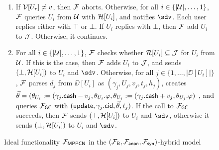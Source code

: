 \begin{figure*}[!t]
{{\begin{enumerate}
	
	
	\item If $\mathcal{V}[U_r] \neq v$, then $\mathcal{F}$ aborts. Otherwise, for all $i \in \{|\mathcal{U}|,\ldots,1\}$, 
	$\mathcal{F}$ queries $U_i$ from $\mathcal{U}$ with $\mathcal{H}[U_i]$, and notifies $\sdv$. Each user replies either 
	with $\top$ or $\bot$. If $U_i$ replies with $\bot$, then $\mathcal{F}$ add $U_i$ to $\mathcal{J}$. 
	Otherwise, it continues.
	
	
	\item For all $i \in \{|\mathcal{U}|,\ldots,1\}$, $\mathcal{F}$ checks whether $\mathcal{R}[U_i] \subseteq \mathcal{J}$ for 
	$U_i$ from $\mathcal{U}$. If this is the case, then $\mathcal{F}$ adds $U_i$ to $\mathcal{J}$, and sends $(\bot, 
	\mathcal{H}[U_i])$ to $U_i$ and $\sdv$. Otherwise, for all $j \in \{1,\ldots,|\DD[U_i]|\}$, $\mathcal{F}$ 
	parses $d_j$ from $\DD[U_i]$ as $(\gamma_j,U_j,v_j,t_j,h_j)$, creates $\vec{\theta} = 
	(\theta_{U_i} := (\gamma_j.\mathsf{cash} - v_j, \theta_{U_i}.\varphi, \theta_{U_j} := (\gamma_j.
	\mathsf{cash} + v_j, \theta_{U_j}.\varphi)$ , 
	and queries $\mathcal{F}_{\mathsf{GC}}$ with $(\mathsf{update},\gamma_j.\mathsf{cid},\vec{\theta},t_j)$. If the 
	call to $\mathcal{F}_{\mathsf{GC}}$ succeeds, then $\mathcal{F}$ sends $(\top, \mathcal{H}[U_i])$ to $U_i$ and $\sdv$, 
	otherwise it sends $(\bot, \mathcal{H}[U_i])$ to $U_i$ and $\sdv$.
\end{enumerate}
}}



\caption{Ideal functionality $\mathcal{F}_{\mathsf{MPPCN}}$ in the $(\mathcal{F}_{\mathsf{B}}, \mathcal{F}_{\mathsf{anon}}, 
\mathcal{F}_{\mathsf{syn}})$-hybrid model}
\label{fig:ideal-mppcn}
\end{figure*}

